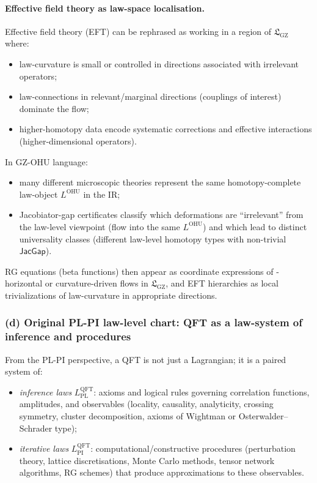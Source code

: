 \documentclass[11pt]{book}
\theoremstyle{plain}
\theoremstyle{definition}
\newcommand{\GZLS}{\ensuremath{\mathfrak{L}_{\mathrm{GZ}}}}       \newcommand{\GZLT}{\ensuremath{M_{!w}}}                           \newcommand{\GZLOC}{\ensuremath{A_M}}                             \newcommand{\GZLCurv}{\ensuremath{\mathcal{F}_{\mathrm{law}}}}
\begin{document}
\paragraph{Effective field theory as law-space localisation.}

Effective field theory (EFT) can be rephrased as working in a region of
$\GZLS$ where:

\begin{itemize}
  \item law-curvature is small or controlled in directions associated
        with irrelevant operators;
  \item law-connections in relevant/marginal directions (couplings of
        interest) dominate the flow;
  \item higher-homotopy data encode systematic corrections and
        effective interactions (higher-dimensional operators).
\end{itemize}

In GZ-OHU language:

\begin{itemize}
  \item many different microscopic theories represent the same
        homotopy-complete law-object $L^{\mathrm{OHU}}$ in the IR;
  \item Jacobiator-gap certificates classify which deformations are
        “irrelevant” from the law-level viewpoint (flow into the same
        $L^{\mathrm{OHU}}$) and which lead to distinct universality
        classes (different law-level homotopy types with non-trivial
        $\mathsf{JacGap}$).
\end{itemize}

RG equations (beta functions) then appear as coordinate expressions of
\GZTLC-horizontal or curvature-driven flows in $\GZLS$, and EFT
hierarchies as local trivializations of law-curvature in appropriate
directions.



\subsubsection*{(d) Original PL-PI law-level chart: QFT as a law-system of inference and procedures}

From the PL-PI perspective, a QFT is not just a Lagrangian; it is a
paired system of:

\begin{itemize}
  \item \emph{inference laws} $L_{\mathrm{PL}}^{\mathrm{QFT}}$:
        axioms and logical rules governing correlation functions,
        amplitudes, and observables (locality, causality, analyticity,
        crossing symmetry, cluster decomposition, axioms of Wightman or
        Osterwalder--Schrader type);
  \item \emph{iterative laws} $L_{\mathrm{PI}}^{\mathrm{QFT}}$:
        computational/constructive procedures (perturbation theory,
        lattice discretisations, Monte Carlo methods, tensor network
        algorithms, RG schemes) that produce approximations to these
        observables.
\end{itemize}
\end{document}
